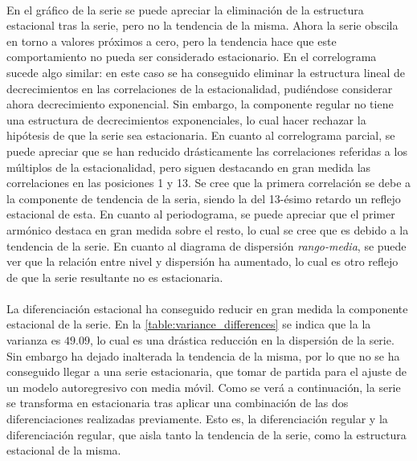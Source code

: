 \documentclass[a4paper, spanish]{article}
\begin{document}
        \paragraph{}
        En el gráfico de la serie se puede apreciar la eliminación de la estructura estacional tras la serie, pero no la tendencia de la misma. Ahora la serie obscila en torno a valores próximos a cero, pero la tendencia hace que este comportamiento no pueda ser considerado estacionario. En el correlograma sucede algo similar: en este caso se ha conseguido eliminar la estructura lineal de decrecimientos en las correlaciones de la estacionalidad, pudiéndose considerar ahora decrecimiento exponencial. Sin embargo, la componente regular no tiene una estructura de decrecimientos exponenciales, lo cual hacer rechazar la hipótesis de que la serie sea estacionaria. En cuanto al correlograma parcial, se puede apreciar que se han reducido drásticamente las correlaciones referidas a los múltiplos de la estacionalidad, pero siguen destacando en gran medida las correlaciones en las posiciones 1 y 13. Se cree que la primera correlación se debe a la componente de tendencia de la seria, siendo la del 13-ésimo retardo un reflejo estacional de esta. En cuanto al periodograma, se puede apreciar que el primer armónico destaca en gran medida sobre el resto, lo cual se cree que es debido a la tendencia de la serie. En cuanto al diagrama de dispersión \emph{rango-media}, se puede ver que la relación entre nivel y dispersión ha aumentado, lo cual es otro reflejo de que la serie resultante no es estacionaria.


        \paragraph{}
        La diferenciación estacional ha conseguido reducir en gran medida la componente estacional de la serie. En la \autoref{table:variance_differences} se indica que la la varianza es $49.09$, lo cual es una drástica reducción en la dispersión de la serie. Sin embargo ha dejado inalterada la tendencia de la misma, por lo que no se ha conseguido llegar a una serie estacionaria, que tomar de partida para el ajuste de un modelo autoregresivo con media móvil. Como se verá a continuación, la serie se transforma en estacionaria tras aplicar una combinación de las dos diferenciaciones realizadas previamente. Esto es, la diferenciación regular y la diferenciación regular, que aisla tanto la tendencia de la serie, como la estructura estacional de la misma.
\end{document}

